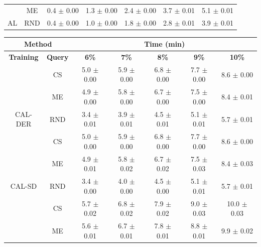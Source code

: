 \begin{table}[htbp]
\begin{tabular*}{\linewidth}{c|c|@{\extracolsep{\fill}}ccccc}
 & ME & 0.4 $\pm$ {\small 0.00} & 1.3 $\pm$ {\small 0.00} & 2.4 $\pm$ {\small 0.00} & 3.7 $\pm$ {\small 0.01} & 5.1 $\pm$ {\small 0.01}\\

\multirow{-3}{*}{\raggedright\arraybackslash AL} & RND & 0.4 $\pm$ {\small 0.00} & 1.0 $\pm$ {\small 0.00} & 1.8 $\pm$ {\small 0.00} & 2.8 $\pm$ {\small 0.01} & 3.9 $\pm$ {\small 0.01}\\
\bottomrule
\end{tabular*}
\vspace{0.5em}

\begin{tabular*}{\linewidth}{c|c|@{\extracolsep{\fill}}ccccc}
\toprule
\multicolumn{2}{c|}{\textbf{Method}} & \multicolumn{5}{c}{\textbf{Time (min)}} \\
\midrule
\textbf{Training} & \textbf{Query} & \textbf{6\%} & \textbf{7\%} & \textbf{8\%} & \textbf{9\%} & \textbf{10\%}\\
\midrule
 & CS & 5.0 $\pm$ {\small 0.00} & 5.9 $\pm$ {\small 0.00} & 6.8 $\pm$ {\small 0.00} & 7.7 $\pm$ {\small 0.00} & 8.6 $\pm$ {\small 0.00}\\

 & ME & 4.9 $\pm$ {\small 0.00} & 5.8 $\pm$ {\small 0.00} & 6.7 $\pm$ {\small 0.00} & 7.5 $\pm$ {\small 0.00} & 8.4 $\pm$ {\small 0.01}\\

\multirow{-3}{*}{\raggedright\arraybackslash CAL-DER} & RND & 3.4 $\pm$ {\small 0.01} & 3.9 $\pm$ {\small 0.01} & 4.5 $\pm$ {\small 0.01} & 5.1 $\pm$ {\small 0.01} & 5.7 $\pm$ {\small 0.01}\\
\midrule
 & CS & 5.0 $\pm$ {\small 0.00} & 5.9 $\pm$ {\small 0.00} & 6.8 $\pm$ {\small 0.00} & 7.7 $\pm$ {\small 0.00} & 8.6 $\pm$ {\small 0.00}\\

 & ME & 4.9 $\pm$ {\small 0.01} & 5.8 $\pm$ {\small 0.02} & 6.7 $\pm$ {\small 0.02} & 7.5 $\pm$ {\small 0.03} & 8.4 $\pm$ {\small 0.03}\\

\multirow{-3}{*}{\raggedright\arraybackslash CAL-SD} & RND & 3.4 $\pm$ {\small 0.00} & 4.0 $\pm$ {\small 0.00} & 4.5 $\pm$ {\small 0.00} & 5.1 $\pm$ {\small 0.01} & 5.7 $\pm$ {\small 0.01}\\
\midrule
 & CS & 5.7 $\pm$ {\small 0.02} & 6.8 $\pm$ {\small 0.02} & 7.9 $\pm$ {\small 0.02} & 9.0 $\pm$ {\small 0.03} & 10.0 $\pm$ {\small 0.03}\\

 & ME & 5.6 $\pm$ {\small 0.01} & 6.7 $\pm$ {\small 0.01} & 7.8 $\pm$ {\small 0.01} & 8.8 $\pm$ {\small 0.01} & 9.9 $\pm$ {\small 0.02}\\


\end{tabular*}
\end{table}
